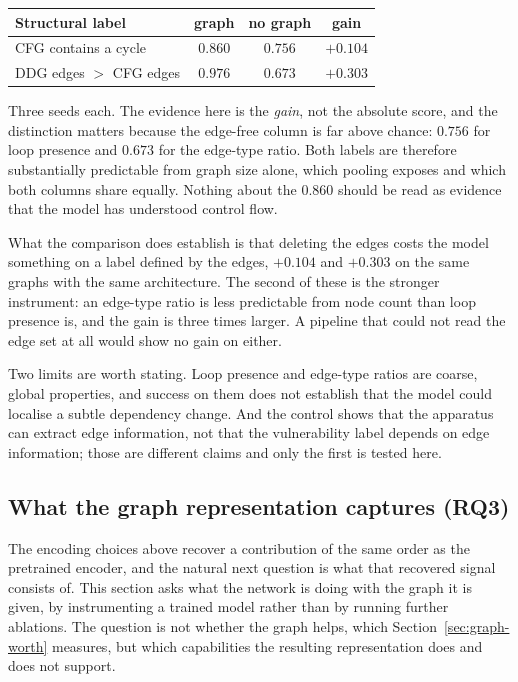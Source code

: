 \begin{center}
\small
\begin{tabular}{lccc}
\toprule
\textbf{Structural label} & \textbf{graph} & \textbf{no graph} & \textbf{gain} \\
\midrule
CFG contains a cycle     & $0.860$ & $0.756$ & $+0.104$ \\
DDG edges $>$ CFG edges  & $0.976$ & $0.673$ & $+0.303$ \\
\bottomrule
\end{tabular}
\end{center}

\noindent Three seeds each. The evidence here is the \emph{gain}, not the
absolute score, and the distinction matters because the edge-free column is far
above chance: $0.756$ for loop presence and $0.673$ for the edge-type ratio.
Both labels are therefore substantially predictable from graph size alone, which
pooling exposes and which both columns share equally. Nothing about the $0.860$
should be read as evidence that the model has understood control flow.

What the comparison does establish is that deleting the edges costs the model
something on a label defined by the edges, $+0.104$ and $+0.303$ on the same
graphs with the same architecture. The second of these is the stronger
instrument: an edge-type ratio is less predictable from node count than loop
presence is, and the gain is three times larger. A pipeline that could not read
the edge set at all would show no gain on either.

Two limits are worth stating. Loop presence and edge-type ratios are coarse,
global properties, and success on them does not establish that the model could
localise a subtle dependency change. And the control shows that the apparatus
can extract edge information, not that the vulnerability label depends on edge
information; those are different claims and only the first is tested here.

\subsection{What the graph representation captures (\textbf{RQ3})}
\label{sec:mechanism}

The encoding choices above recover a contribution of the same order as the
pretrained encoder, and the natural next question is what that recovered signal
consists of. This section asks what the network is doing with the graph it is
given, by
instrumenting a trained model rather than by running further ablations. The
question is not whether the graph helps, which
Section~\ref{sec:graph-worth} measures, but which capabilities the resulting
representation does and does not support.

